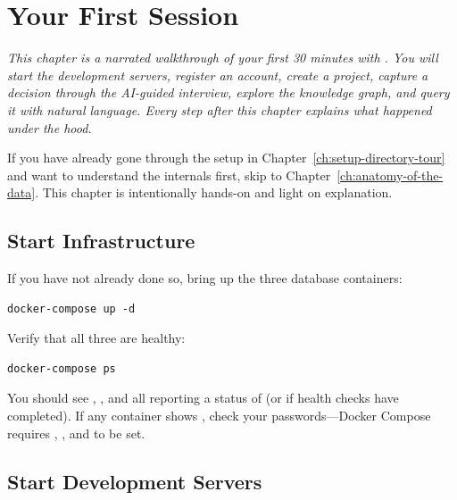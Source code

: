 \chapter{Your First Session}
\label{ch:your-first-session}

\textit{This chapter is a narrated walkthrough of your first 30 minutes with
\sysname{}.  You will start the development servers, register an account, create
a project, capture a decision through the AI-guided interview, explore the
knowledge graph, and query it with natural language.  Every step after this
chapter explains what happened under the hood.}

\begin{skipahead}
If you have already gone through the setup in Chapter~\ref{ch:setup-directory-tour}
and want to understand the internals first, skip to
Chapter~\ref{ch:anatomy-of-the-data}.  This chapter is intentionally hands-on
and light on explanation.
\end{skipahead}


\section{Start Infrastructure}
\label{sec:start-infra}

If you have not already done so, bring up the three database containers:

\begin{lstlisting}[style=bash, numbers=none]
docker-compose up -d
\end{lstlisting}

Verify that all three are healthy:

\begin{lstlisting}[style=bash, numbers=none]
docker-compose ps
\end{lstlisting}

You should see , , and
 all reporting a status of  (or  if
health checks have completed).  If any container shows , check
your  passwords---Docker Compose requires
, , and
 to be set.


\section{Start Development Servers}
\label{sec:start-dev-servers}

